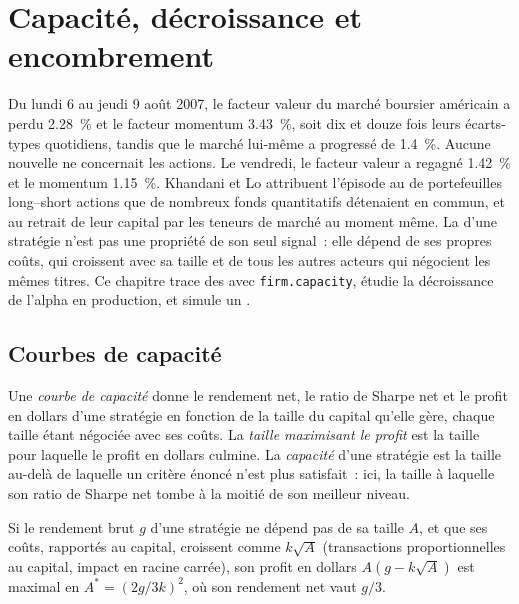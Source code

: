 \chapter{Capacité, décroissance et encombrement}\label{ch:rs:capacity-decay-and-crowding}

Du lundi 6 au jeudi 9 août 2007, le facteur valeur du marché boursier américain a perdu 2.28~\% et le facteur momentum 3.43~\%, soit dix et douze fois
leurs écarts-types quotidiens, tandis que le marché lui-même a progressé de 1.4~\%. Aucune nouvelle ne concernait les actions. Le vendredi, le facteur valeur a regagné 1.42~\%
et le momentum 1.15~\%. Khandani et Lo attribuent l'épisode au  de portefeuilles long--short actions que de nombreux fonds quantitatifs détenaient en commun, et au
retrait de leur capital par les teneurs de marché au moment même. La  d'une stratégie n'est pas une propriété de son seul signal~: elle dépend de ses propres coûts, qui croissent
avec sa taille et de tous les autres acteurs qui négocient les mêmes titres. Ce chapitre trace des  avec \texttt{firm.capacity}, étudie la décroissance de l'alpha en production,
et simule un .

\section{Courbes de capacité}

\begin{definition}\label{def:rs:capacity-decay-and-crowding:capacity}
Une \emph{courbe de capacité} donne le rendement net, le ratio de Sharpe net et le profit en dollars d'une stratégie en fonction de la taille du capital qu'elle gère, chaque
taille étant négociée avec ses coûts. La \emph{taille maximisant le profit} est la taille pour laquelle le profit en dollars culmine. La
\emph{capacité} d'une stratégie est la taille au-delà de laquelle un critère énoncé n'est plus satisfait~: ici, la taille à laquelle son ratio de Sharpe net tombe à la moitié de son meilleur niveau.
\end{definition}

\begin{proposition}\label{prop:rs:capacity-decay-and-crowding:size}
Si le rendement brut $g$ d'une stratégie ne dépend pas de sa taille $A$, et que ses coûts, rapportés au capital, croissent comme $k\sqrt A$ (transactions proportionnelles au capital,
impact en racine carrée), son profit en dollars $A(g - k\sqrt A)$ est maximal en $A^* = (2g/3k)^2$, où son rendement net vaut $g/3$.
\end{proposition}

